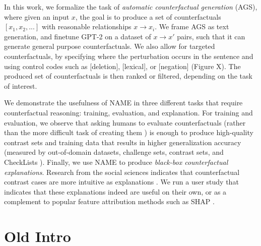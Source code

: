 In this work, we formalize the task of \emph{automatic counterfactual generation} (AGS), where given an input $x$, the goal is to produce a set of counterfactuals $[x_1, x_2, ...]$ with reasonable relationships $x \rightarrow x_i$. We frame AGS as text generation, and finetune GPT-2 \cite{radford2019language} on a dataset of $x \rightarrow x'$ pairs, such that it can generate general purpose counterfactuals. We also allow for targeted counterfactuals, by specifying where the perturbation occurs in the sentence \cite{donahue2020enabling} and using control codes such as [deletion], [lexical], or [negation] (Figure X). The produced set of counterfactuals is then ranked or filtered, depending on the task of interest.

We demonstrate the usefulness of NAME in three different tasks that require counterfactual reasoning: training, evaluation, and explanation. For training and evaluation, we observe that asking humans to evaluate counterfactuals (rather than the more difficult task of creating them \cite{gardner2020contrast, kaushik2019learning}) is enough to produce high-quality contrast sets \cite{gardner2020contrast} and training data that results in higher generalization accuracy (measured by out-of-domain datasets, challenge sets, contrast sets, and CheckLists \cite{checklist:acl20}).
Finally, we use NAME to produce \emph{black-box counterfactual explanations}. Research from the social sciences indicates that counterfactual contrast cases are more intuitive as explanations \cite{miller}. We run a user study that indicates that these explanations indeed are useful on their own, or as a complement to popular feature attribution methods such as SHAP \cite{NIPS2017_7062}.

\section{Old Intro}



